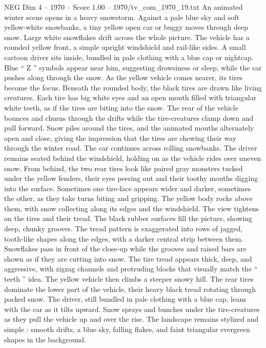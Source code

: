 \begin{textsample}{NEG Dim 4 – 1970 – Score 1.00 – 1970/tv\_com\_1970\_19.txt}  \label{ex:f4_neg_006}
An animated winter scene opens in a heavy snowstorm.
Against a pale blue sky and soft yellow-white snowbanks, a tiny yellow open car or buggy moves through deep snow.
Large white snowflakes drift across the whole picture.
The vehicle has a rounded yellow front, a simple upright windshield and rail-like sides.
A small cartoon driver sits inside, bundled in pale clothing with a blue cap or nightcap.
Blue “ Z ” symbols appear near him, suggesting drowsiness or sleep, while the car pushes along through the snow.
As the yellow vehicle comes nearer, its tires become the focus.
Beneath the rounded body, the black tires are drawn like living creatures.
Each tire has big white eyes and an open mouth filled with triangular white teeth, as if the tires are biting into the snow.
The rear of the vehicle bounces and churns through the drifts while the tire-creatures clamp down and pull forward.
Snow piles around the tires, and the animated mouths alternately open and close, giving the impression that the tires are chewing their way through the winter road.
The car continues across rolling snowbanks.
The driver remains seated behind the windshield, holding on as the vehicle rides over uneven snow.
From behind, the two rear tires look like paired gray monsters tucked under the yellow fenders, their eyes peering out and their toothy mouths digging into the surface.
Sometimes one tire-face appears wider and darker, sometimes the other, as they take turns biting and gripping.
The yellow body rocks above them, with snow collecting along its edges and the windshield.
The view tightens on the tires and their tread.
The black rubber surfaces fill the picture, showing deep, chunky grooves.
The tread pattern is exaggerated into rows of jagged, tooth-like shapes along the edges, with a darker central strip between them.
Snowflakes pass in front of the close-up while the grooves and raised bars are shown as if they are cutting into snow.
The tire tread appears thick, deep, and aggressive, with zigzag channels and protruding blocks that visually match the “ teeth ” idea.
The yellow vehicle then climbs a steeper snowy hill.
The rear tires dominate the lower part of the vehicle, their heavy black tread rotating through packed snow.
The driver, still bundled in pale clothing with a blue cap, leans with the car as it tilts upward.
Snow sprays and bunches under the tire-creatures as they pull the vehicle up and over the rise.
The landscape remains stylized and simple : smooth drifts, a blue sky, falling flakes, and faint triangular evergreen shapes in the background.

\end{textsample}
